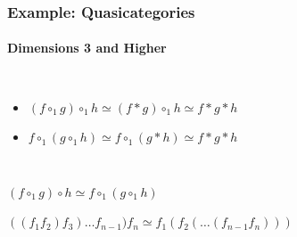 \documentclass{beamer}
\newcommand{\newthought}[1]{\medskip\noindent\fbox{{#1}}}
\begin{document}
\begin{frame}

\frametitle{Example: Quasicategories}
\framesubtitle{Dimensions 3 and Higher}


\begin{columns}


\begin{itemize}
\item $(f \circ_1 g) \circ_1 h \simeq (f*g) \circ_1 h \simeq f * g * h$

\medskip

\item $f \circ_1 (g \circ_1 h) \simeq f \circ_1 (g*h) \simeq f * g * h$

\end{itemize}
\end{columns}



\medskip




\newthought{$\Delta^3$: } $(f \circ_1 g) \circ h \simeq f \circ_1 (g \circ_1 h)$



\medskip


\newthought{$\Delta^n$: } $((f_1 f_2) f_3) \ldots f_{n-1})f_n \simeq f_1 (f_2 (\ldots (f_{n-1} f_n)))$





\end{frame}
\end{document}

